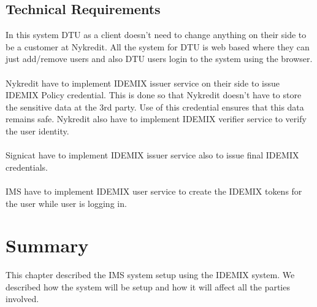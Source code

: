 \subsection{Technical Requirements}
In this system DTU as a client doesn't need to change anything on their side to be a customer at Nykredit. All the system for DTU is web based where they can just add/remove users and also DTU users login to the system using the browser.
\\
\\Nykredit have to implement IDEMIX issuer service on their side to issue IDEMIX Policy credential. This is done so that Nykredit doesn’t have to store the sensitive data at the 3rd party. Use of this credential ensures that this data remains safe. Nykredit also have to implement IDEMIX verifier service to verify the user identity.
\\
\\Signicat have to implement IDEMIX issuer service also to issue final IDEMIX credentials.
\\\\
IMS have to implement IDEMIX user service to create the IDEMIX tokens for the user while user is logging in.
\section{Summary}
This chapter described the IMS system setup using the IDEMIX system. We described how the system will be setup and how it will affect all the parties involved.

